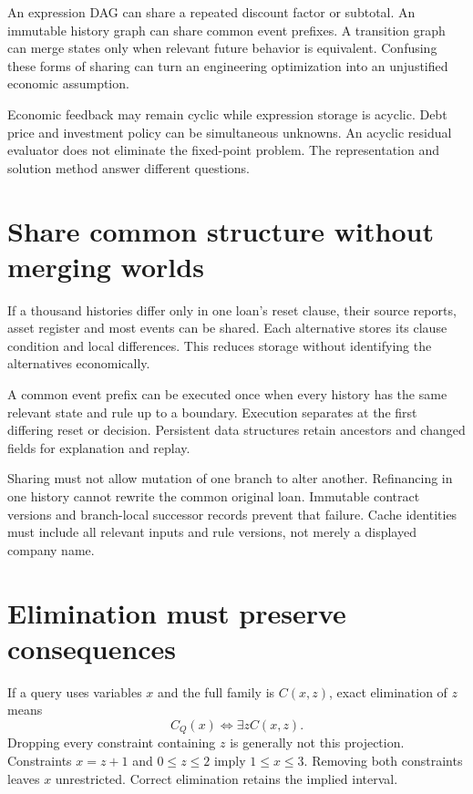 An expression DAG can share a repeated discount factor or subtotal. An immutable history graph can share common event prefixes. A transition graph can merge states only when relevant future behavior is equivalent. Confusing these forms of sharing can turn an engineering optimization into an unjustified economic assumption.

Economic feedback may remain cyclic while expression storage is acyclic. Debt price and investment policy can be simultaneous unknowns. An acyclic residual evaluator does not eliminate the fixed-point problem. The representation and solution method answer different questions.

\section{Share common structure without merging worlds}
If a thousand histories differ only in one loan's reset clause, their source reports, asset register and most events can be shared. Each alternative stores its clause condition and local differences. This reduces storage without identifying the alternatives economically.

A common event prefix can be executed once when every history has the same relevant state and rule up to a boundary. Execution separates at the first differing reset or decision. Persistent data structures retain ancestors and changed fields for explanation and replay.

Sharing must not allow mutation of one branch to alter another. Refinancing in one history cannot rewrite the common original loan. Immutable contract versions and branch-local successor records prevent that failure. Cache identities must include all relevant inputs and rule versions, not merely a displayed company name.

\section{Elimination must preserve consequences}
If a query uses variables $x$ and the full family is $C(x,z)$, exact elimination of $z$ means
\begin{equation}
 C_Q(x)\Longleftrightarrow \exists z C(x,z).
 \label{sim:projection}
\end{equation}
Dropping every constraint containing $z$ is generally not this projection. Constraints $x=z+1$ and $0\leq z\leq2$ imply $1\leq x\leq3$. Removing both constraints leaves $x$ unrestricted. Correct elimination retains the implied interval.

